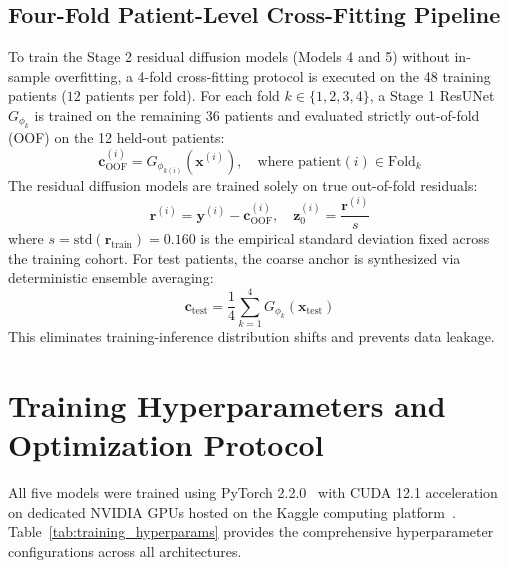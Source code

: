 \subsection{Four-Fold Patient-Level Cross-Fitting Pipeline}
To train the Stage 2 residual diffusion models (Models 4 and 5) without in-sample overfitting, a 4-fold cross-fitting protocol is executed on the 48 training patients ($12$ patients per fold). For each fold $k \in \{1, 2, 3, 4\}$, a Stage 1 ResUNet $G_{\phi_k}$ is trained on the remaining 36 patients and evaluated strictly out-of-fold (OOF) on the 12 held-out patients:
\begin{equation}
\mathbf{c}_{\text{OOF}}^{(i)} = G_{\phi_{k(i)}}\left(\mathbf{x}^{(i)}\right), \quad \text{where } \text{patient}(i) \in \text{Fold}_k
\label{eq:oof_prediction}
\end{equation}
The residual diffusion models are trained solely on true out-of-fold residuals:
\begin{equation}
\mathbf{r}^{(i)} = \mathbf{y}^{(i)} - \mathbf{c}_{\text{OOF}}^{(i)}, \quad \mathbf{z}_0^{(i)} = \frac{\mathbf{r}^{(i)}}{s}
\label{eq:residual_scaling}
\end{equation}
where $s = \text{std}(\mathbf{r}_{\text{train}}) = 0.160$ is the empirical standard deviation fixed across the training cohort. For test patients, the coarse anchor is synthesized via deterministic ensemble averaging:
\begin{equation}
\mathbf{c}_{\text{test}} = \frac{1}{4} \sum_{k=1}^4 G_{\phi_k}(\mathbf{x}_{\text{test}})
\label{eq:test_ensemble_coarse}
\end{equation}
This eliminates training-inference distribution shifts and prevents data leakage.

\section{Training Hyperparameters and Optimization Protocol}
All five models were trained using PyTorch 2.2.0~\cite{paszke2019pytorch} with CUDA 12.1 acceleration on dedicated NVIDIA GPUs hosted on the Kaggle computing platform~\cite{kaggle2024platform}. Table~\ref{tab:training_hyperparams} provides the comprehensive hyperparameter configurations across all architectures.

